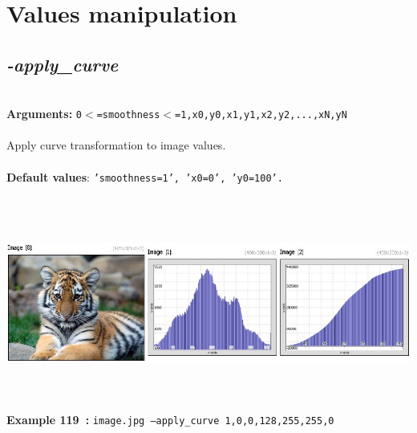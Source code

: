 \documentclass[a4paper,11pt,twoside]{book}
\begin{document}
\section{Values manipulation}


\subsection{\emph{-apply\_curve} }\vspace*{-0.5em}
~\\\textbf{Arguments: } 
{\small \texttt{0$<$=smoothness$<$=1,x0,y0,x1,y1,x2,y2,...,xN,yN}}\\~\\
Apply curve transformation to image values.
~\\~\\\textbf{Default values}: {\small \texttt{'smoothness=1', 'x0=0', 'y0=100'.}}
\begin{center}\includegraphics[keepaspectratio=true,height=7cm,width=\textwidth]{img/gmic_def119.jpg}\\
{\footnotesize \textbf{Example 119~:} \texttt{image.jpg --apply\_curve 1,0,0,128,255,255,0}}
\end{center}
\end{document}
